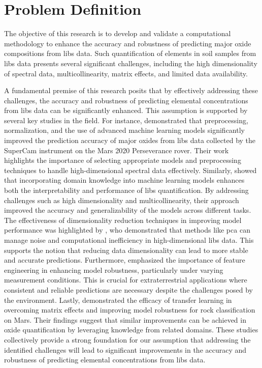\section{Problem Definition}\label{sec:problem_definition}
The objective of this research is to develop and validate a computational methodology to enhance the accuracy and robustness of predicting major oxide compositions from \gls{libs} data.
Such quantification of elements in soil samples from \gls{libs} data presents several significant challenges, including the high dimensionality of spectral data, multicollinearity, matrix effects, and limited data availability.

A fundamental premise of this research posits that by effectively addressing these challenges, the accuracy and robustness of predicting elemental concentrations from \gls{libs} data can be significantly enhanced. This assumption is supported by several key studies in the field.
For instance, \citet{andersonPostlandingMajorElement2022} demonstrated that preprocessing, normalization, and the use of advanced machine learning models significantly improved the prediction accuracy of major oxides from \gls{libs} data collected by the SuperCam instrument on the Mars 2020 Perseverance rover. Their work highlights the importance of selecting appropriate models and preprocessing techniques to handle high-dimensional spectral data effectively.
Similarly, \citet{song_DF-K-ELM} showed that incorporating domain knowledge into machine learning models enhances both the interpretability and performance of \gls{libs} quantification. By addressing challenges such as high dimensionality and multicollinearity, their approach improved the accuracy and generalizability of the models across different tasks.
The effectiveness of dimensionality reduction techniques in improving model performance was highlighted by \citet{rezaei_dimensionality_reduction}, who demonstrated that methods like \gls{pca} can manage noise and computational inefficiency in high-dimensional \gls{libs} data. This supports the notion that reducing data dimensionality can lead to more stable and accurate predictions.
Furthermore, \citet{jeonEffectsFeatureEngineering2024} emphasized the importance of feature engineering in enhancing model robustness, particularly under varying measurement conditions. This is crucial for extraterrestrial applications where consistent and reliable predictions are necessary despite the challenges posed by the environment.
Lastly, \citet{sunMachineLearningTransfer2021} demonstrated the efficacy of transfer learning in overcoming matrix effects and improving model robustness for rock classification on Mars. Their findings suggest that similar improvements can be achieved in oxide quantification by leveraging knowledge from related domains.
These studies collectively provide a strong foundation for our assumption that addressing the identified challenges will lead to significant improvements in the accuracy and robustness of predicting elemental concentrations from \gls{libs} data.

